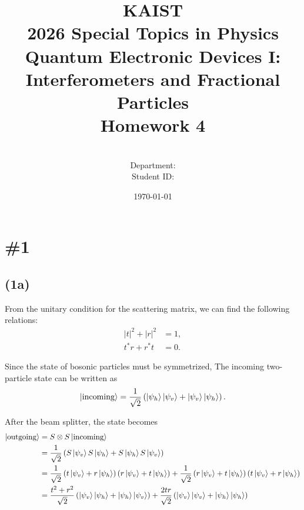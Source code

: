 \documentclass[a4paper,11pt]{article}
\title{KAIST\\2026 Special Topics in Physics Quantum Electronic Devices I: Interferometers and Fractional Particles\\
Homework 4\bigskip}
\author{\textbf{\Large \name} \\
Department: \department\\
Student ID: \studentid}
\date{\today}
\begin{document}
\thispagestyle{empty}
\maketitle
\tableofcontents
{}
\setcounter{secnumdepth}{1}
\setcounter{tocdepth}{2}

\newcommand{\tr}{\operatorname{tr}}
\newcommand{\sgn}{\operatorname{sgn}}
\newcommand{\supp}{\operatorname{supp}}
\renewcommand{\Re}{\operatorname{Re}}
\renewcommand{\Im}{\operatorname{Im}}
\newcommand{\boltz}{k_{\mathrm{B}}}

\section{\#1}
\subsection{(1a)}

From the unitary condition for the scattering matrix, we can find the following relations:
\begin{align}
    |t|^2 + |r|^2 &= 1, \\
    t^*r + r^*t &= 0.
\end{align}

Since the state of bosonic particles must be symmetrized, The incoming two-particle state can be written as
\begin{equation}
    \ket{\text{incoming}} = \frac{1}{\sqrt{2}}\left(\ket{\psi_h}\ket{\psi_v} + \ket{\psi_v}\ket{\psi_h}\right).
\end{equation}

After the beam splitter, the state becomes
\begin{align}
    \ket{\text{outgoing}} 
    &= S\otimes S \ket{\text{incoming}} \\
    &= \frac{1}{\sqrt{2}}\left(S\ket{\psi_v}S\ket{\psi_h} + S\ket{\psi_h}S\ket{\psi_v}\right) \\
    &= \frac{1}{\sqrt{2}}\left(t\ket{\psi_v} + r\ket{\psi_h}\right)\left(r\ket{\psi_v} + t\ket{\psi_h}\right) + \frac{1}{\sqrt{2}}\left(r\ket{\psi_v} + t\ket{\psi_h}\right)\left(t\ket{\psi_v} + r\ket{\psi_h}\right) \\
    &= \frac{t^2 + r^2}{\sqrt{2}}\left(\ket{\psi_v}\ket{\psi_h} + \ket{\psi_h}\ket{\psi_v}\right) + \frac{2tr}{\sqrt{2}}\left(\ket{\psi_v}\ket{\psi_v} + \ket{\psi_h}\ket{\psi_h}\right)
\end{align}
\end{document}
